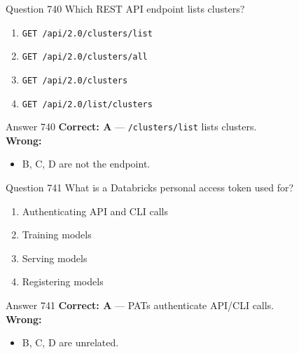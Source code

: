 \documentclass[aspectratio=169,11pt]{beamer}
\begin{document}
	\begin{frame}{Question 740}
		Which REST API endpoint lists clusters?
		\begin{enumerate}[label=\Alph*.]
			\item \texttt{GET /api/2.0/clusters/list}
			\item \texttt{GET /api/2.0/clusters/all}
			\item \texttt{GET /api/2.0/clusters}
			\item \texttt{GET /api/2.0/list/clusters}
		\end{enumerate}
	\end{frame}
	\begin{frame}{Answer 740}
		\textbf{Correct: A} --- \texttt{/clusters/list} lists clusters.\\
		\vspace{0.5em}
		\textbf{Wrong:}
		\begin{itemize}
			\item B, C, D are not the endpoint.
		\end{itemize}
	\end{frame}
	
	\begin{frame}{Question 741}
		What is a Databricks personal access token used for?
		\begin{enumerate}[label=\Alph*.]
			\item Authenticating API and CLI calls
			\item Training models
			\item Serving models
			\item Registering models
		\end{enumerate}
	\end{frame}
	\begin{frame}{Answer 741}
		\textbf{Correct: A} --- PATs authenticate API/CLI calls.\\
		\vspace{0.5em}
		\textbf{Wrong:}
		\begin{itemize}
			\item B, C, D are unrelated.
		\end{itemize}
	\end{frame}
	
\end{document}

